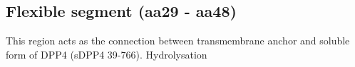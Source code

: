 \subsection{Flexible segment (aa29 - aa48)}

This region acts as the connection between transmembrane anchor and soluble form of DPP4 (sDPP4 39-766). Hydrolysation 
